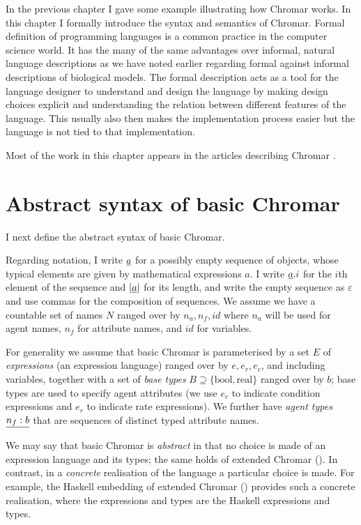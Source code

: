 In the previous chapter I gave some example illustrating how Chromar works. In
this chapter I formally introduce the syntax and semantics of Chromar. Formal
definition of programming languages is a common practice in the computer science
world. It has the many of the same advantages over informal, natural language
descriptions as we have noted earlier regarding formal against informal
descriptions of biological models. The formal description acts as a tool for the
language designer to understand and design the language by making design choices
explicit and understanding the relation between different features of the
language. This usually also then makes the implementation process easier but the
language is not tied to that implementation.

Most of the work in this chapter appears in the articles describing Chromar
\citep{honorato-zimmer_chromar_2017, honorato-zimmer_chromar_2018}.


\section{Abstract syntax of basic Chromar}
\label{sec:syntax}
I next define the abstract syntax of basic Chromar.

Regarding notation, I write $\underline{a}$ for a possibly empty sequence of objects,
whose typical elements are given by mathematical expressions $a$. I write
$\underline{a}.i$ for the $i$th element of the sequence and $|\underline{a}|$ for its length,
and write the empty sequence as $\varepsilon$ and use commas for the composition
of sequences.  We assume we have a countable set of names $N$ ranged over by
$n_a, n_f, id$ where $n_a$ will be used for agent names, $n_f$ for attribute
names, and $id$ for variables.

For generality we assume that basic Chromar is parameterised by a set $E$ of
\emph{expressions} (an expression language) ranged over by $e, e_r, e_c$, and
including variables, together with a set of \emph{base types}
$B \supseteq \{\mathrm{bool}, \mathrm{real} \}$ ranged over by $b$; base types are used to
specify agent attributes (we use $e_c$ to indicate condition expressions and
$e_r$ to indicate rate expressions).
%
We further have \emph{agent types} $\underline{n_f:b}$ that are sequences of distinct
typed attribute names.

We may say that basic Chromar is \emph{abstract} in that no choice is made of an
expression language and its types; the same holds of extended Chromar
().  In contrast, in a \emph{concrete} realisation of the
language a particular choice is made.  For example, the Haskell embedding of
extended Chromar () provides such a concrete realisation, where
the expressions and types are the Haskell expressions and types.

